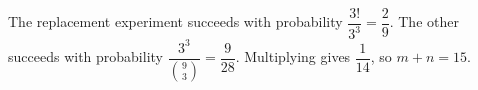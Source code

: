 The replacement experiment succeeds with probability $\dfrac{3!}{3^3}=\dfrac{2}{9}$. The other succeeds with probability $\dfrac{3^3}{\binom93}=\dfrac{9}{28}$. Multiplying gives $\dfrac{1}{14}$, so $\boxed{m+n=15}$.
